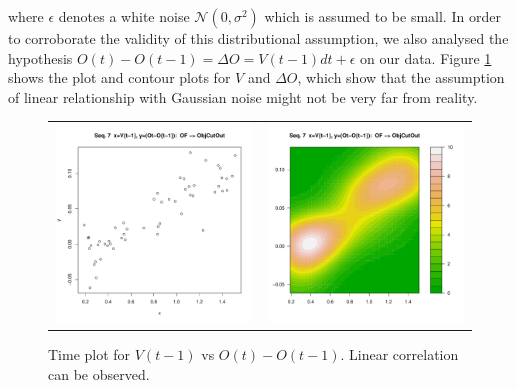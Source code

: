 where $\epsilon$ denotes a white noise $\mathcal{N}(0,\sigma^2)$ which is assumed to be small. In order to corroborate the validity of this distributional assumption, we also analysed the hypothesis $O(t) - O(t-1) = \Delta O = V(t-1)dt +\epsilon$ on our data. Figure \ref{Figure:daimlerVvsOffs} shows the plot and contour plots for $V$ and $\Delta O$, which show that the assumption of linear relationship with Gaussian noise might not be very far from reality.

\begin{figure}
  \centering
  \setlength{\tabcolsep}{0.05pt}
  \renewcommand{\arraystretch}{0.02}
    \begin{tabular}{cc}
    \includegraphics[width=60mm]{figures/DaimlerOBJplotSerie7.pdf}&
    \includegraphics[width=60mm]{figures/DaimlerOBJcontourSerie7.pdf}\\
  \end{tabular}
      \caption{ \label{Figure:daimlerVvsOffs}Time plot for $V(t-1)$ vs $O(t) - O(t-1)$. Linear correlation can be observed.}
\end{figure}


